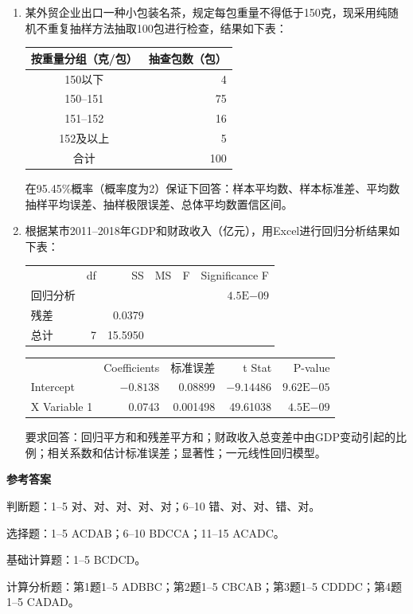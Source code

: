 \documentclass[UTF8,a4paper,10pt]{ctexart}
\begin{document}
\begin{enumerate}
\item 某外贸企业出口一种小包装名茶，规定每包重量不得低于150克，现采用纯随机不重复抽样方法抽取100包进行检查，结果如下表：
\begin{center}\begin{tabular}{cr}\toprule 按重量分组（克/包）&抽查包数（包）\\\midrule150以下&4\\150--151&75\\151--152&16\\152及以上&5\\合计&100\\\bottomrule\end{tabular}\end{center}
在95.45\%概率（概率度为2）保证下回答：样本平均数、样本标准差、平均数抽样平均误差、抽样极限误差、总体平均数置信区间。
\item 根据某市2011--2018年GDP和财政收入（亿元），用Excel进行回归分析结果如下表：
\begin{center}\begin{tabular}{lrrrrr}\toprule &df&SS&MS&F&Significance F\\回归分析&&&&&$4.5\mathrm E{-09}$\\残差&&0.0379&&&\\总计&7&15.5950&&&\\\bottomrule\end{tabular}\par\smallskip
\begin{tabular}{lrrrr}\toprule &Coefficients&标准误差&t Stat&P-value\\Intercept&$-0.8138$&0.08899&$-9.14486$&$9.62\mathrm E{-05}$\\X Variable 1&0.0743&0.001498&49.61038&$4.5\mathrm E{-09}$\\\bottomrule\end{tabular}\end{center}
要求回答：回归平方和和残差平方和；财政收入总变差中由GDP变动引起的比例；相关系数和估计标准误差；显著性；一元线性回归模型。
\end{enumerate}
\newpage\begin{center}{\sffamily\bfseries 参考答案}\end{center}
判断题：1--5 对、对、对、对、对；6--10 错、对、对、错、对。\par
选择题：1--5 ACDAB；6--10 BDCCA；11--15 ACADC。\par
基础计算题：1--5 BCDCD。\par
计算分析题：第1题1--5 ADBBC；第2题1--5 CBCAB；第3题1--5 CDDDC；第4题1--5 CADAD。
\end{document}
